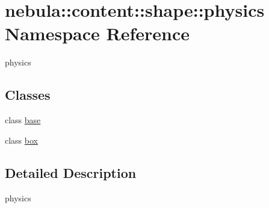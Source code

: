 \hypertarget{namespacenebula_1_1content_1_1shape_1_1physics}{
\section{nebula::content::shape::physics Namespace Reference}
\label{namespacenebula_1_1content_1_1shape_1_1physics}
}


physics  
\subsection*{Classes}
\begin{DoxyCompactItemize}
\item 
class \hyperlink{classnebula_1_1content_1_1shape_1_1physics_1_1base}{base}
\item 
class \hyperlink{classnebula_1_1content_1_1shape_1_1physics_1_1box}{box}
\end{DoxyCompactItemize}


\subsection{Detailed Description}
physics 
